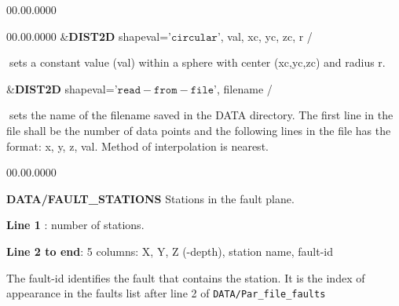 \begin{lyxlist}{00.00.0000}
\begin{lyxlist}{00.00.0000}
\&\textbf{DIST2D} shapeval='$\mathtt{circular}$', val, xc, yc, zc, r
/


$\;$sets a constant value (val) within a sphere with center (xc,yc,zc)
and radius r.


\&\textbf{DIST2D} shapeval='$\mathtt{read-from-file}$', filename
/


$\;$sets the name of the filename saved in the DATA directory.
The first line in the file shall be the number of data points and the
following lines in the file has the format:
x, y, z, val. Method of interpolation is nearest.
\\



\end{lyxlist}
\end{lyxlist}

\begin{lyxlist}{00.00.0000}
\item [{\textbf{DATA/FAULT\_STATIONS}}] Stations in the fault plane.


\textbf{Line 1} : number of stations.


\textbf{Line 2 to end}: 5 columns: X, Y, Z (-depth), station name,
fault-id


The fault-id identifies the fault that contains the station. It is
the index of appearance in the faults list after line 2 of \texttt{DATA/Par\_file\_faults}

\end{lyxlist}

